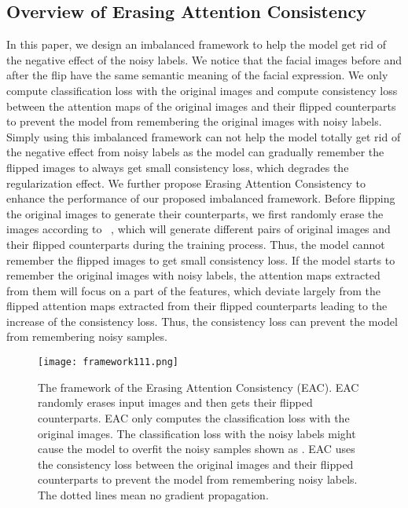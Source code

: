 \documentclass[runningheads]{llncs}
\begin{document}
\subsection{Overview of Erasing Attention Consistency}
In this paper, we design an imbalanced framework to help the model get rid of the negative effect of the noisy labels. We notice that the facial images before and after the flip have the same semantic meaning of the facial expression. We only compute classification loss with the original images and compute consistency loss between the attention maps of the original images and their flipped counterparts to prevent the model from remembering the original images with noisy labels. Simply using this imbalanced framework can not help the model totally get rid of the negative effect from noisy labels as the model can gradually remember the flipped images to always get small consistency loss, which degrades the regularization effect. We further propose Erasing Attention Consistency to enhance the performance of our proposed imbalanced framework. Before flipping the original images to generate their counterparts, we first randomly erase the images according to ~\cite{zhong2020random}, which will generate different pairs of original images and their flipped counterparts during the training process. Thus, the model cannot remember the flipped images to get small consistency loss. If the model starts to remember the original images with noisy labels, the attention maps extracted from them will focus on a part of the features, which deviate largely from the flipped attention maps extracted from their flipped counterparts leading to the increase of the consistency loss. Thus, the consistency loss can prevent the model from remembering noisy samples.

\begin{figure}[!t]
\centering
\texttt{[image: framework111.png]}
\caption{The framework of the Erasing Attention Consistency (EAC). EAC randomly erases input images and then gets their flipped counterparts. EAC only computes the classification loss with the original images. The classification loss with the noisy labels might cause the model to overfit the noisy samples shown as . EAC uses the consistency loss between the original images and their flipped counterparts to prevent the model from remembering noisy labels. The dotted lines mean no gradient propagation.}
\label{fig:example}
\end{figure}
\end{document}
